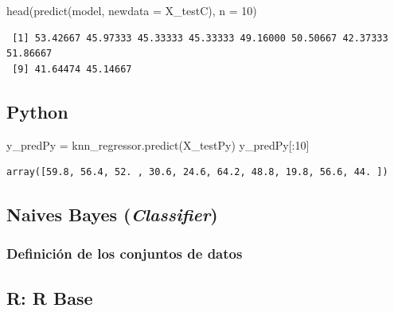 \documentclass[
  letterpaper,
  DIV=11,
  numbers=noendperiod]{scrartcl}
\newenvironment{Shaded}{\begin{snugshade}}{\end{snugshade}}
\newcommand{\AttributeTok}[1]{\textcolor[rgb]{0.40,0.45,0.13}{#1}}
\newcommand{\DecValTok}[1]{\textcolor[rgb]{0.68,0.00,0.00}{#1}}
\newcommand{\FunctionTok}[1]{\textcolor[rgb]{0.28,0.35,0.67}{#1}}
\newcommand{\NormalTok}[1]{\textcolor[rgb]{0.00,0.23,0.31}{#1}}
\newcommand{\OperatorTok}[1]{\textcolor[rgb]{0.37,0.37,0.37}{#1}}
\begin{document}
\begin{Shaded}
\begin{Highlighting}[]
\FunctionTok{head}\NormalTok{(}\FunctionTok{predict}\NormalTok{(model, }\AttributeTok{newdata =}\NormalTok{ X\_testC), }\AttributeTok{n =} \DecValTok{10}\NormalTok{)}
\end{Highlighting}
\end{Shaded}

\begin{verbatim}
 [1] 53.42667 45.97333 45.33333 45.33333 49.16000 50.50667 42.37333 51.86667
 [9] 41.64474 45.14667
\end{verbatim}

\subsection{Python}

\begin{Shaded}
\begin{Highlighting}[]
\NormalTok{y\_predPy }\OperatorTok{=}\NormalTok{ knn\_regressor.predict(X\_testPy)}
\NormalTok{y\_predPy[:}\DecValTok{10}\NormalTok{]}
\end{Highlighting}
\end{Shaded}

\begin{verbatim}
array([59.8, 56.4, 52. , 30.6, 24.6, 64.2, 48.8, 19.8, 56.6, 44. ])
\end{verbatim}

\subsection{\texorpdfstring{Naives Bayes
(\emph{Classifier})}{Naives Bayes (Classifier)}}\label{naives-bayes-classifier}

\subsubsection{Definición de los conjuntos de
datos}\label{definiciuxf3n-de-los-conjuntos-de-datos}

\subsection{R: R Base}
\end{document}
